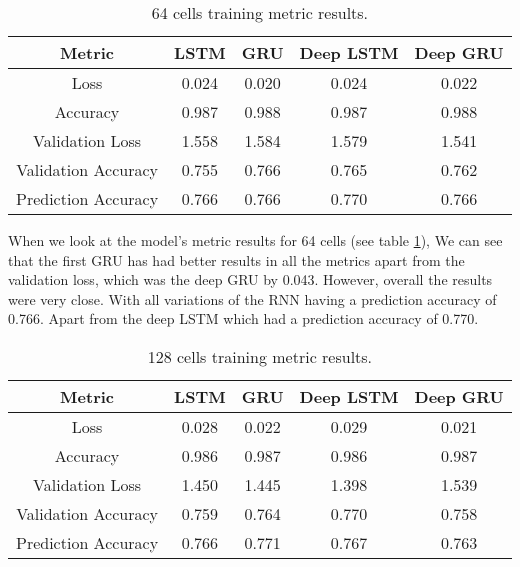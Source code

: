 \documentclass[a4paper,10pt]{article}
\begin{document}
		\begin{table}[ht]
		\centering
		\small
		\begin{tabular}[t]{ | c | c | c | c | c | }
			\hline
			Metric              & LSTM  & GRU   & Deep LSTM & Deep GRU \\ 
			\hline
			Loss                & 0.024 & 0.020 & 0.024     & 0.022 \\ 
			\hline
			Accuracy            & 0.987 & 0.988 & 0.987     & 0.988  \\ 
			\hline
			Validation Loss     & 1.558 & 1.584 & 1.579     & 1.541 \\
			\hline
			Validation Accuracy & 0.755 & 0.766 & 0.765     & 0.762 \\
			\hline
			Prediction Accuracy & 0.766     & 0.766 & 0.770     & 0.766  \\ 
			\hline
		\end{tabular}
		\caption{64 cells training metric results.}
		\label{tab:64_metrics}
	\end{table}%
	

	When we look at the model's metric results for 64 cells (see table \ref{tab:64_metrics}), We can see that the first GRU has had better results in all the metrics apart from the validation loss, which was the deep GRU by 0.043. However, overall the results were very close. With all variations of the RNN having a prediction accuracy of 0.766. Apart from the deep LSTM which had a prediction accuracy of 0.770.


	\begin{table}[ht]
		\centering
		\small
		\begin{tabular}[t]{ | c | c | c | c | c | }
			\hline
			Metric          & LSTM      & GRU   & Deep LSTM & Deep GRU \\ 
			\hline
			Loss            & 0.028     & 0.022 & 0.029     & 0.021 \\ 
			\hline
			Accuracy        & 0.986     & 0.987 & 0.986     & 0.987  \\ 
			\hline
			Validation Loss & 1.450     & 1.445 & 1.398     & 1.539 \\
			\hline
			Validation Accuracy & 0.759 & 0.764 & 0.770     & 0.758 \\
			\hline
			Prediction Accuracy & 0.766     & 0.771 & 0.767     & 0.763 \\
			\hline
		\end{tabular}
		\caption{128 cells training metric results.}
		\label{tab:128_metrics}
	\end{table}%
\end{document}
